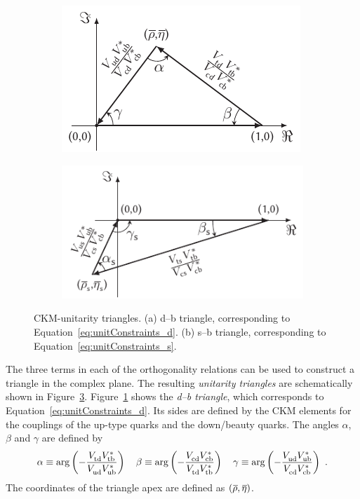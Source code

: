 \begin{figure}[tb]
  \centering
  \begin{subfigure}{0.475\textwidth}
    \raggedright
    \includegraphics[width=\textwidth]{graphics/intro/tikz/b-d-triangle}
    \caption{}
    \label{fig:unitTriangles_bd}
  \end{subfigure}%
  \begin{subfigure}{0.525\textwidth}
    \raggedleft
    \includegraphics[width=\textwidth]{graphics/intro/tikz/b-s-triangle}
    \caption{}
    \label{fig:unitTriangles_bs}
  \end{subfigure}
  \caption{CKM-unitarity triangles. (a) d--b triangle, corresponding to Equation~\ref{eq:unitConstraints_d}. (b) s--b triangle,
           corresponding to Equation~\ref{eq:unitConstraints_s}.}
  \label{fig:unitTriangles}
\end{figure}

The three terms in each of the orthogonality relations can be used to construct a triangle in the complex plane. The resulting
\emph{unitarity triangles} are schematically shown in Figure~\ref{fig:unitTriangles}. Figure~\ref{fig:unitTriangles_bd} shows the
\emph{d--b triangle}, which corresponds to Equation~\ref{eq:unitConstraints_d}. Its sides are defined by the CKM elements for the couplings
of the up-type quarks and the down/beauty quarks. The angles $\alpha$, $\beta$ and $\gamma$ are defined by
\begin{equation}
  \label{eq:bdAnglesDef}
  \alpha \equiv \arg\left( -\frac{\Vtd\Vtb[*]}{\Vud\Vub[*]} \right)
  \quad
  \beta  \equiv \arg\left( -\frac{\Vcd\Vcb[*]}{\Vtd\Vtb[*]} \right)
  \quad
  \gamma \equiv \arg\left( -\frac{\Vud\Vub[*]}{\Vcd\Vcb[*]} \right)
  \ .
\end{equation}
The coordinates of the triangle apex are defined as $(\rhobar, \etabar)$.

